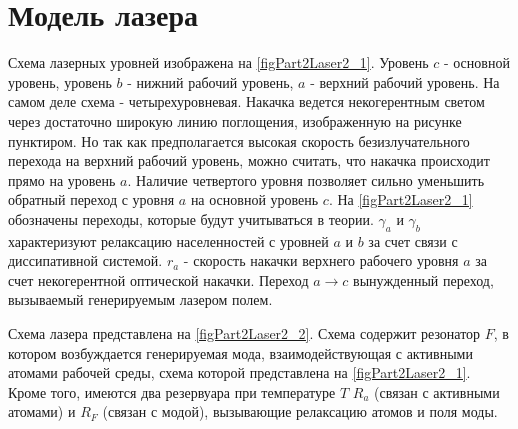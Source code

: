 \section{Модель лазера}

Схема лазерных уровней изображена на
\autoref{figPart2Laser2_1}. Уровень $c$ - основной уровень, уровень $b$ -
нижний рабочий уровень, $a$ - верхний рабочий уровень. На самом деле
схема - четырехуровневая. Накачка ведется некогерентным светом через
достаточно широкую линию поглощения, изображенную на рисунке
пунктиром. Но так как предполагается высокая скорость
безизлучательного перехода на верхний рабочий уровень, можно считать,
что накачка происходит прямо на уровень $a$. Наличие четвертого уровня
позволяет сильно уменьшить обратный переход с уровня $a$ на основной
уровень $c$. На \autoref{figPart2Laser2_1} обозначены переходы,
которые будут учитываться в теории. $\gamma_a$ и $\gamma_b$
характеризуют релаксацию населенностей с уровней $a$ и $b$ за счет
связи с диссипативной системой. $r_a$ - скорость накачки верхнего
рабочего уровня $a$ за счет некогерентной оптической накачки. Переход
$a \rightarrow c$ вынужденный переход, вызываемый генерируемым лазером
полем.



Схема лазера представлена на \autoref{figPart2Laser2_2}. Схема
содержит резонатор $F$, в котором возбуждается генерируемая мода,
взаимодействующая с активными атомами рабочей среды, схема которой
представлена на \autoref{figPart2Laser2_1}. Кроме того, имеются два
резервуара при температуре $T$ $R_{a}$ (связан с
активными атомами) и $R_{F}$ (связан с модой), вызывающие релаксацию
атомов и поля моды.



